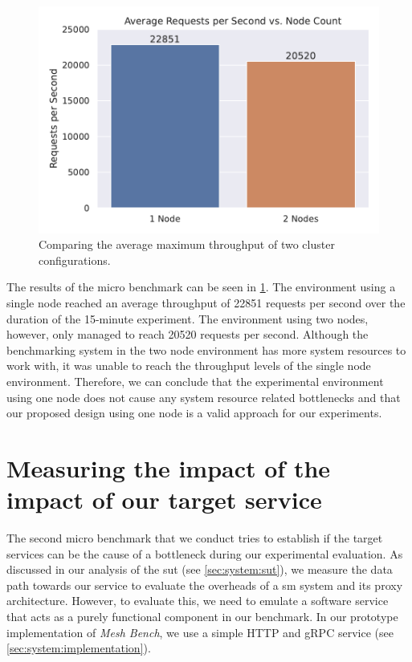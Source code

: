 \begin{figure}[!t]
    \centering
    
    \includegraphics[width=0.8\linewidth]{5_experimental_evaluation/figures/microbench-node-count.pdf}

    \caption[Micro Benchmark - Comparing the average maximum throughput of two cluster configurations]{Comparing the average maximum throughput of two cluster configurations.}
    
    \label{fig:microbench:node-count}
\end{figure}

The results of the micro benchmark can be seen in \cref{fig:microbench:node-count}. The environment using a single node reached an average throughput of 22851 requests per second over the duration of the 15-minute experiment. The environment using two nodes, however, only managed to reach 20520 requests per second. Although the benchmarking system in the two node environment has more system resources to work with, it was unable to reach the throughput levels of the single node environment. Therefore, we can conclude that the experimental environment using one node does not cause any system resource related bottlenecks and that our proposed design using one node is a valid approach for our experiments.


\section{Measuring the impact of the impact of our target service}
\label{sec:experiments:microbenchmarks:target-svc}

The second micro benchmark that we conduct tries to establish if the target services can be the cause of a bottleneck during our experimental evaluation. As discussed in our analysis of the \gls{sut} (see \cref{sec:system:sut}), we measure the data path towards our service to evaluate the overheads of a \gls{sm} system and its proxy architecture. However, to evaluate this, we need to emulate a software service that acts as a purely functional component in our benchmark. In our prototype implementation of \textit{Mesh Bench}, we use a simple HTTP and gRPC service (see \cref{sec:system:implementation}). 

